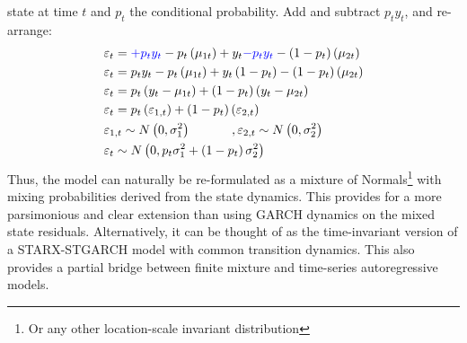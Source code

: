 state at time $t$ and $p_t$ the conditional probability. Add and subtract
${p_t}{y_t}$, and re-arrange:
\begin{equation}\label{eq:starmix}
\begin{gathered}
  {\varepsilon _t} =  {\color{blue}+ {p_t}{y_t}} - {p_t}\left( {{\mu _{1t}}}
  \right) + {y_t} {\color{blue} - {p_t}{y_t}} - \left( {1 - {p_t}} \right)\left(
  {{\mu _{2t}}} \right) \hfill \\
  {\varepsilon _t} = {p_t}{y_t} - {p_t}\left( {{\mu _{1t}}} \right) + {y_t}\left( {1 - {p_t}} \right) - \left( {1 - {p_t}} \right)\left( {{\mu _{2t}}} \right) \hfill \\
  {\varepsilon _t} = {p_t}\left( {{y_t} - {\mu _{1t}}} \right) + \left( {1 - {p_t}} \right)\left( {{y_t} - {\mu _{2t}}} \right) \hfill \\
  {\varepsilon _t} = {p_t}\left( {{\varepsilon _{1,t}}} \right) + \left( {1 - {p_t}} \right)\left( {{\varepsilon _{2,t}}} \right) \hfill \\
  {\varepsilon _{1,t}} \sim N\left( {0,\sigma _1^2} \right) \hfill, {\varepsilon
  _{2,t}} \sim N\left( {0,\sigma _2^2} \right) \hfill \\
  {\varepsilon _t} \sim N\left( {0,{p_t}\sigma _1^2 + \left( {1 - {p_t}}
  \right)\sigma _2^2} \right) \hfill \\
\end{gathered}
\end{equation}
Thus, the model can naturally be re-formulated as a mixture of
Normals\footnote{Or any other location-scale invariant distribution} with
mixing probabilities derived from the state dynamics.
This provides for a more parsimonious and clear extension than using GARCH dynamics on the mixed state
residuals. Alternatively, it can be thought of as the time-invariant version of
a STARX-STGARCH model with common transition dynamics. This also provides a
partial bridge between finite mixture and time-series autoregressive models.

